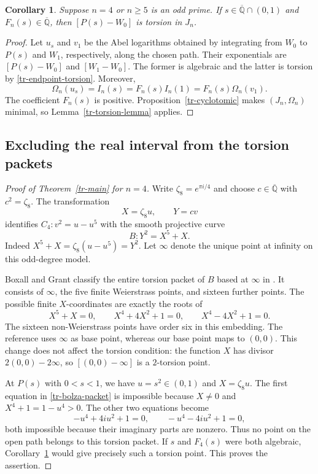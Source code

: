 \documentclass[11pt,a4paper]{article}
\newtheorem{corollary}[theorem]{Corollary}
\theoremstyle{definition}
\theoremstyle{remark}
\numberwithin{equation}{section}
\newcommand{\Qbar}{\overline{\mathbb Q}}
\begin{document}
\begin{corollary}\label{tr-reduction-to-packet}
Suppose $n=4$ or $n\geq5$ is an odd prime.  If $s\in\Qbar\cap(0,1)$
and $F_n(s)\in\Qbar$, then $[P(s)-W_0]$ is torsion in $J_n$.
\end{corollary}

\begin{proof}
Let $u_s$ and $v_1$ be the Abel logarithms obtained by integrating from
$W_0$ to $P(s)$ and $W_1$, respectively, along the chosen path.
Their exponentials are $[P(s)-W_0]$ and $[W_1-W_0]$.  The former is
algebraic and the latter is torsion by \eqref{tr-endpoint-torsion}.
Moreover,
\[
 \Omega_n(u_s)=I_n(s)=F_n(s)I_n(1)=F_n(s)\Omega_n(v_1).
\]
The coefficient $F_n(s)$ is positive.  Proposition~\ref{tr-cyclotomic}
makes $(J_n,\Omega_n)$ minimal, so Lemma~\ref{tr-torsion-lemma} applies.
\end{proof}

\subsection{Excluding the real interval from the torsion packets}
\label{tr-subsec-packets}

\begin{proof}[Proof of Theorem~\ref{tr-main} for $n=4$]
Write $\zeta_8=e^{\pi i/4}$ and choose $c\in\Qbar$ with
$c^2=\zeta_8$.  The transformation
\begin{equation}\label{tr-bolza-transform}
 X=\zeta_8u,\qquad Y=cv
\end{equation}
identifies $C_4:v^2=u-u^5$ with the smooth projective curve
\begin{equation}\label{tr-bolza}
 B:Y^2=X^5+X.
\end{equation}
Indeed $X^5+X=\zeta_8(u-u^5)=Y^2$.  Let $\infty$ denote the unique
point at infinity on this odd-degree model.

Boxall and Grant classify the entire torsion packet of $B$ based at
$\infty$ in \cite[Theorem~(0.3)]{tr-boxall-grant}.  It consists of
$\infty$, the five finite Weierstrass points, and sixteen further
points.  The possible finite $X$-coordinates are exactly the roots of
\begin{equation}\label{tr-bolza-packet}
 X^5+X=0,\qquad X^4+4X^2+1=0,\qquad X^4-4X^2+1=0.
\end{equation}
The sixteen non-Weierstrass points have order six in this embedding.
The reference uses $\infty$ as base point, whereas our base point maps
to $(0,0)$.  This change does not affect the torsion condition: the
function $X$ has divisor $2(0,0)-2\infty$, so
$[(0,0)-\infty]$ is a $2$-torsion point.

At $P(s)$ with $0<s<1$, we have $u=s^2\in(0,1)$ and
$X=\zeta_8u$.  The first equation in \eqref{tr-bolza-packet} is
impossible because $X\ne0$ and $X^4+1=1-u^4>0$.  The other two
equations become
\[
 -u^4+4iu^2+1=0,\qquad -u^4-4iu^2+1=0,
\]
both impossible because their imaginary parts are nonzero.  Thus no
point on the open path belongs to this torsion packet.  If $s$ and
$F_4(s)$ were both algebraic, Corollary~\ref{tr-reduction-to-packet}
would give precisely such a torsion point.  This proves the assertion.
\end{proof}
\end{document}
